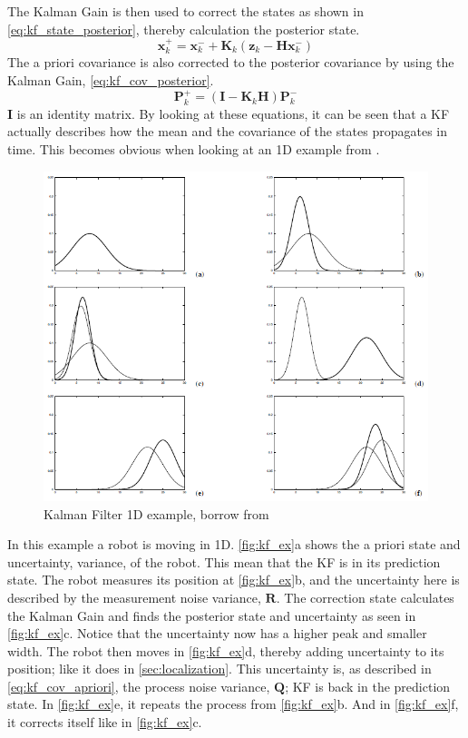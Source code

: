 \documentclass[Main]{subfiles}
\begin{document}
The Kalman Gain is then used to correct the states as shown in \autoref{eq:kf_state_posterior}, thereby calculation the posterior state. 
\begin{equation}
	\label{eq:kf_state_posterior}
	\mathbf{x}_k^+ = \mathbf{x}_k^- + \mathbf{K}_k (\mathbf{z}_k - \mathbf{H} \mathbf{x}_k^-)
\end{equation}
The a priori covariance is also corrected to the posterior covariance by using the Kalman Gain, \autoref{eq:kf_cov_posterior}.
\begin{equation}
\label{eq:kf_cov_posterior}
\mathbf{P}_k^+ = (\mathbf{I} - \mathbf{K}_k \mathbf{H}) \mathbf{P}_k^-
\end{equation}
$\mathbf{I}$ is an identity matrix.
By looking at these equations, it can be seen that a KF actually describes how the mean and the covariance of the states propagates in time.
This becomes obvious when looking at an 1D example from \citep{Thrun2002}.
\begin{figure}[H]
	\centering
	\includegraphics[width=0.8\linewidth]{./Figures/kf_ex.png}
	\caption{Kalman Filter 1D example, borrow from \citep{Thrun2002}}
	\label{fig:kf_ex}
\end{figure}\noindent

\newpage
In this example a robot is moving in 1D.
\autoref{fig:kf_ex}a shows the a priori state and uncertainty, variance, of the robot.
This mean that the KF is in its prediction state.
The robot measures its position at \autoref{fig:kf_ex}b, and the uncertainty here is described by the measurement noise variance, $\mathbf{R}$.
The correction state calculates the Kalman Gain and finds the posterior state and uncertainty as seen in \autoref{fig:kf_ex}c.
Notice that the uncertainty now has a higher peak and smaller width.
The robot then moves in \autoref{fig:kf_ex}d, thereby adding uncertainty to its position; like it does in \autoref{sec:localization}.
This uncertainty is, as described in \autoref{eq:kf_cov_apriori}, the process noise variance, $\mathbf{Q}$; KF is back in the prediction state.
In \autoref{fig:kf_ex}e, it repeats the process from \autoref{fig:kf_ex}b.
And in \autoref{fig:kf_ex}f, it corrects itself like in \autoref{fig:kf_ex}c.
\end{document}
